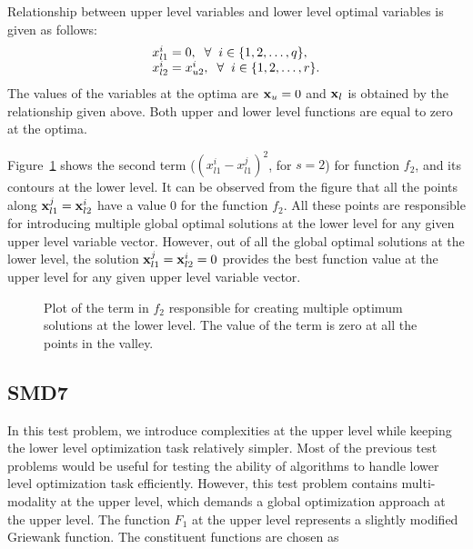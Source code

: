 \documentclass[twoside]{article}
\begin{document}
Relationship between upper level variables and lower level optimal variables is given as follows:
\begin{equation}
\begin{array}{l}
x_{l1}^{i} = 0, \hspace{2mm} \forall \hspace{2mm} i \in \{1,2,\ldots,q\},\\
x_{l2}^{i} = x_{u2}^{i}, \hspace{2mm} \forall \hspace{2mm} i \in \{1,2,\ldots,r\}.
\end{array}
\end{equation}
The values of the variables at the optima are $\mbox{$\mathbf{x}$}_u=0$ and $\mbox{$\mathbf{x}$}_l$ is obtained by the relationship given above. Both upper and
lower level functions are equal to zero at the optima.

Figure~\ref{fig:multipleOpt} shows the second term ($(x_{l1}^{i} - x_{l1}^{j})^2$, for $s=2$) for function $f_2$, and its contours at the lower level. It can be observed from the figure that all the points along $\mbox{$\mathbf{x}$}_{l1}^{j} = \mbox{$\mathbf{x}$}_{l2}^{i}$ have a value 0 for the function $f_2$. All these points are responsible for introducing multiple global optimal solutions at the lower level for any given upper level variable vector. However, out of all the global optimal solutions at the lower level, the solution $\mbox{$\mathbf{x}$}_{l1}^{j} = \mbox{$\mathbf{x}$}_{l2}^{i} = 0$ provides the best function value at the upper level for any given upper level variable vector.

\begin{figure}
\begin{center}
\caption{Plot of the term in $f_2$ responsible for creating multiple optimum solutions at the lower level. The value of the term is zero at all the points in the valley.}
\label{fig:multipleOpt}
\end{center}
\end{figure}

\subsection{SMD7}
In this test problem, we introduce complexities at the upper level while keeping the lower level optimization task relatively simpler. Most of the previous test problems would be useful for testing the ability of algorithms to handle lower level optimization task efficiently. However, this test problem contains multi-modality at the upper level, which demands a global optimization approach at the upper level. The function $F_1$ at the upper level represents a slightly modified Griewank function. The constituent functions are chosen as
\end{document}
